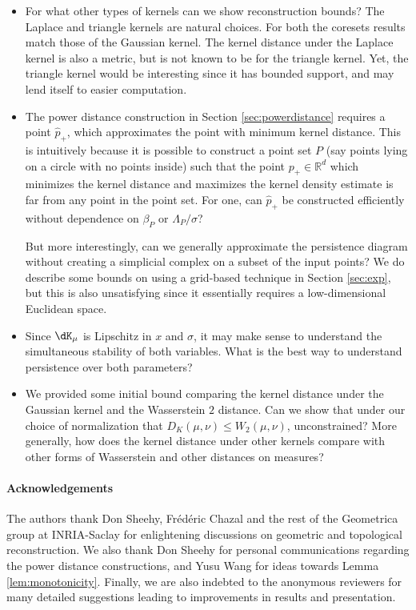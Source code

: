 \documentclass[11pt]{myclass}
\begin{document}
\begin{itemize}
\item For what other types of kernels can we show reconstruction bounds?  The Laplace and triangle kernels are natural choices.  For both the coresets results match those of the Gaussian kernel.  The kernel distance under the Laplace kernel is also a metric, but is not known to be for the triangle kernel.  Yet, the triangle kernel would be interesting since it has bounded support, and may lend itself to easier computation.  

\item The power distance construction in Section \ref{sec:powerdistance} requires a point $\hat p_+$, which approximates the point with minimum kernel distance.  This is intuitively because it is possible to construct a point set $P$ (say points lying on a circle with no points inside) such that the point $p_+ \in \mathbb{R}^d$ which minimizes the kernel distance and maximizes the kernel density estimate is far from any point in the point set.  
For one, can $\hat p_+$ be constructed efficiently without dependence on $\beta_P$ or $\Lambda_P/\sigma$?  

But more interestingly, can we generally approximate the persistence diagram without creating a simplicial complex on a subset of the input points?  We do describe some bounds on using a grid-based technique in Section \ref{sec:exp}, but this is also unsatisfying since it essentially requires a low-dimensional Euclidean space.  

\item Since $\dK_\mu$ is Lipschitz in $x$ and $\sigma$, it may make sense to understand the simultaneous stability of both variables.  What is the best way to understand persistence over both parameters?  

\item We provided some initial bound comparing the kernel distance under the Gaussian kernel and the Wasserstein $2$ distance.  Can we show that under our choice of normalization that $D_K(\mu,\nu) \leq W_2(\mu,\nu)$, unconstrained?  More generally, how does the kernel distance under other kernels compare with other forms of Wasserstein and other distances on measures?  
\end{itemize}








\paragraph{Acknowledgements}
The authors thank Don Sheehy, Fr\'{e}d\'{e}ric Chazal and the rest of the Geometrica group at  INRIA-Saclay for enlightening discussions on geometric and topological reconstruction.  
We also thank Don Sheehy for personal communications regarding the power distance constructions, 
and Yusu Wang for ideas towards Lemma \ref{lem:monotonicity}.  Finally, we are also indebted to the anonymous reviewers for many detailed suggestions leading to improvements in results and presentation.  
\end{document}
